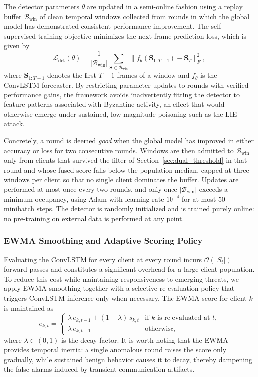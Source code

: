 \documentclass[journal]{IEEEtran}
\begin{document}
The detector parameters $\theta$ are updated in a semi-online fashion using a replay buffer $\mathcal{B}_{\text{win}}$ of clean temporal windows collected from rounds in which the global model has demonstrated consistent performance improvement. The self-supervised training objective minimizes the next-frame prediction loss, which is given by
\begin{equation}
\mathcal{L}_{\text{det}}(\theta) = \frac{1}{|\mathcal{B}_{\text{win}}|} \sum_{\mathbf{S} \in \mathcal{B}_{\text{win}}} \|f_\theta(\mathbf{S}_{1:T-1}) - \mathbf{S}_T\|_F^2,
\label{eq:det_loss}
\end{equation}
where $\mathbf{S}_{1:T-1}$ denotes the first $T-1$ frames of a window and $f_\theta$ is the ConvLSTM forecaster. By restricting parameter updates to rounds with verified performance gains, the framework avoids inadvertently fitting the detector to feature patterns associated with Byzantine activity, an effect that would otherwise emerge under sustained, low-magnitude poisoning such as the LIE attack.

Concretely, a round is deemed \emph{good} when the global model has improved in either accuracy or loss for two consecutive rounds. Windows are then admitted to $\mathcal{B}_{\text{win}}$ only from clients that survived the filter of Section~\ref{sec:dual_threshold} in that round and whose fused score falls below the population median, capped at three windows per client so that no single client dominates the buffer. Updates are performed at most once every two rounds, and only once $|\mathcal{B}_{\text{win}}|$ exceeds a minimum occupancy, using Adam with learning rate $10^{-4}$ for at most $50$ minibatch steps. The detector is randomly initialized and is trained purely online: no pre-training on external data is performed at any point.

\subsubsection{EWMA Smoothing and Adaptive Scoring Policy}
Evaluating the ConvLSTM for every client at every round incurs $\mathcal{O}(|S_t|)$ forward passes and constitutes a significant overhead for a large client population. To reduce this cost while maintaining responsiveness to emerging threats, we apply EWMA smoothing together with a selective re-evaluation policy that triggers ConvLSTM inference only when necessary. The EWMA score for client $k$ is maintained as
\begin{equation}
e_{k,t} =
\begin{cases}
\lambda \, e_{k,t-1} + (1 - \lambda) \, s_{k,t} & \text{if $k$ is re-evaluated at $t$,}\\
\lambda \, e_{k,t-1} & \text{otherwise,}
\end{cases}
\label{eq:ewma}
\end{equation}
where $\lambda \in (0,1)$ is the decay factor. It is worth noting that the EWMA provides temporal inertia: a single anomalous round raises the score only gradually, while sustained benign behavior causes it to decay, thereby dampening the false alarms induced by transient communication artifacts.
\end{document}
